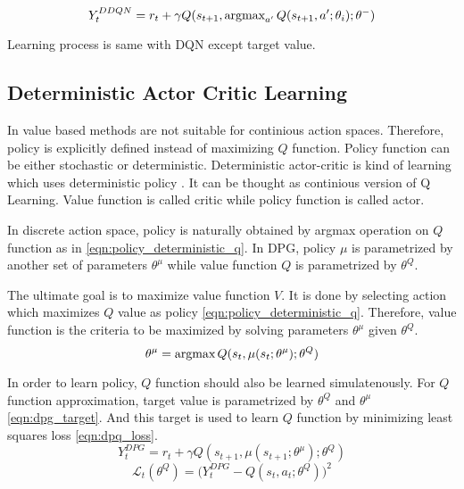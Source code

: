\begin{equation}
\label{eqn:ddqn_ntarget}
Y_t^{DDQN} = r_t + \gamma Q(s_{t+1}, \operatorname{\textup{argmax}}_{a'} Q(s_{t+1}, a'; \theta_i );\theta^-)
\end{equation}

Learning process is same with DQN except target value.

\subsection{Deterministic Actor Critic Learning}
In value based methods are not suitable for continious action spaces. Therefore, policy is explicitly defined instead of maximizing $Q$ function. Policy function can be either stochastic or deterministic.  Deterministic actor-critic is kind of learning which uses deterministic policy \cite{silver_deterministic_2014}. It can be thought as continious version of Q Learning. Value function is called critic while policy function is called actor.

In discrete action space, policy is naturally obtained by argmax operation on $Q$ function as in \ref{eqn:policy_deterministic_q}. In DPG, policy $\mu$ is parametrized by another set of parameters $\theta^\mu$ while value function $Q$ is parametrized by $\theta^Q$. 

The ultimate goal is to maximize value function $V$. It is done by selecting action which maximizes $Q$ value as policy \eqref{eqn:policy_deterministic_q}. Therefore, value function is the criteria to be maximized by solving parameters $\theta^\mu$ given $\theta^Q$. 
%
\begin{equation}
\label{eqn:dpg_value_maximization}
\theta^\mu = \operatorname{\textup{argmax}} Q(s_t, \mu(s_t;\theta^\mu);\theta^Q)
\end{equation}

In order to learn policy, $Q$ function should also be learned simulatenously. For $Q$ function approximation, target value is parametrized by $\theta^Q$ and $\theta^\mu$ \eqref{eqn:dpg_target}. And this target is used to learn $Q$ function by minimizing least squares loss \eqref{eqn:dpq_loss}.
%
\begin{equation}
\label{eqn:dpg_target}
Y_t^{DPG} = r_t + \gamma Q(s_{t+1}, \mu(s_{t+1};\theta^\mu);\theta^Q)
\end{equation}
%
\begin{equation}
\label{eqn:dpq_loss}
\mathcal{L}_t(\theta^Q) = \big( Y_t^{DPG} - Q(s_t,a_t;\theta^Q) \big) ^ 2
\end{equation}

